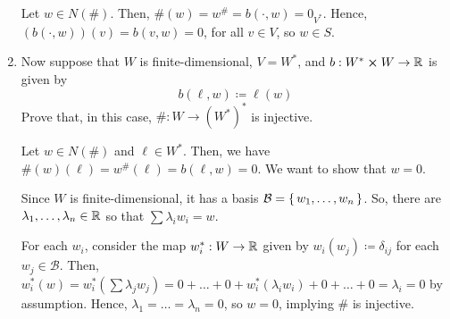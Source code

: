 \documentclass{article}
\begin{document}
\begin{problem}
\begin{enumerate}[label=\bfalph]
\begin{solution}
		      Let $w \in N(\#)$.
		      Then, $\#(w) = w^{\#} = b(\cdot, w) = 0_{V^*}$.
		      Hence, $(b(\cdot, w))(v) = b(v, w) = 0$, for all $v \in V$, so $w \in S$.
	      \end{solution}

	      \newpage
	\item Now suppose that $W$ is finite-dimensional, $V = W^*$, and $b : W^* \cross W \to \mathbb{R}$ is given by
	      \[
		      b(\ell, w) \coloneq \ell(w)
	      \]
	      Prove that, in this case, $\# : W \to (W^*)^*$ is injective.
	      \begin{solution}
		      Let $w \in N(\#)$ and $\ell \in W^*$.
		      Then, we have $\#(w)(\ell) = w^{\#}(\ell) = b(\ell, w) = 0$.
		      We want to show that $w = 0$.

		      Since $W$ is finite-dimensional, it has a basis $\mathcal{B} = \set{w_1, \dots, w_n}$.
		      So, there are $\lambda_1, \dots, \lambda_n \in \mathbb{R}$ so that $\sum \lambda_i w_i = w$.

		      For each $w_i$, consider the map $w_i^* : W \to \mathbb{R}$ given by $w_i(w_j) \coloneq \delta_{ij}$ for each $w_j \in \mathcal{B}$.
		      Then, $w_i^*(w) = w_i^*(\sum \lambda_j w_j) = 0 + \dots + 0 + w_{i}^*(\lambda_i w_i) + 0 + \dots + 0 = \lambda_i = 0$ by assumption.
		      Hence, $\lambda_1 = \dots = \lambda_n = 0$, so $w = 0$, implying $\#$ is injective.
	      \end{solution}
\end{enumerate}
\end{problem}
\end{document}
